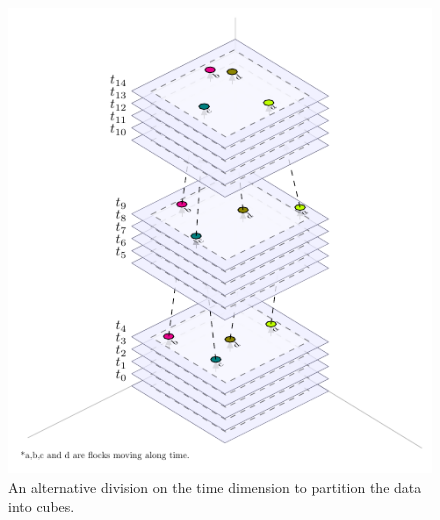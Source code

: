 \begin{figure}
    \centering
    \includegraphics[width=0.9\linewidth]
    {chapterPFlocks/figures/plots/11_temporal_partitions/Cube-based}
    \caption{An alternative division on the time dimension to partition the data into cubes.}\label{fig:cube_alternative}
\end{figure}
